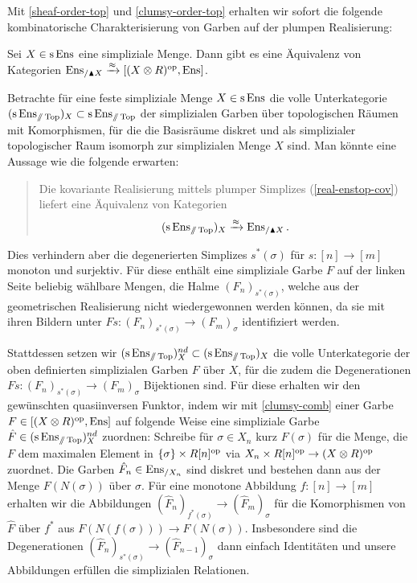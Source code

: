 Mit \ref{sheaf-order-top} und \ref{clumsy-order-top} erhalten wir
sofort die folgende kombinatorische Charakterisierung von Garben auf
der plumpen Realisierung:
\begin{prop} \label{clumsy-comb}
  Sei $X \in \operatorname{s}\operatorname{Ens}$ eine simpliziale Menge. Dann gibt es eine
  Äquivalenz von Kategorien $\operatorname{Ens}_{/\blacktriangle X} \xrightarrow{\approx} [(X
    \otimes R)^\mathrm{op}, \operatorname{Ens}]$.
\end{prop}
\begin{bem}
  Betrachte für eine feste simpliziale Menge $X \in \operatorname{s}\operatorname{Ens}$ die volle
  Unterkategorie $(\operatorname{s}\operatorname{Ens}_{\mathbin{/\mkern-6mu/} \operatorname{Top}})_X \subset \operatorname{s}\operatorname{Ens}_{\mathbin{/\mkern-6mu/} \operatorname{Top}}$ der
  simplizialen Garben über topologischen Räumen mit Komorphismen, für
  die die Basisräume diskret und als simplizialer topologischer Raum
  isomorph zur simplizialen Menge $X$ sind. Man könnte eine Aussage
  wie die folgende erwarten:
  \begin{quote}
    Die kovariante Realisierung mittels plumper Simplizes
    (\ref{real-enstop-cov}) liefert eine Äquivalenz von Kategorien
    \[ (\operatorname{s}\operatorname{Ens}_{\mathbin{/\mkern-6mu/} \operatorname{Top}})_X \xrightarrow{\approx} \operatorname{Ens}_{/\blacktriangle X}. \]
  \end{quote}
  Dies verhindern aber die degenerierten Simplizes $s^*(\sigma)$ für
  $s: [n] \to [m]$ monoton und surjektiv. Für diese enthält eine
  simpliziale Garbe $F$ auf der linken Seite beliebig wählbare Mengen,
  die Halme $(F_n)_{s^*(\sigma)}$, welche aus der geometrischen
  Realisierung nicht wiedergewonnen werden können, da sie mit ihren
  Bildern unter $Fs: (F_n)_{s^*(\sigma)} \to (F_m)_\sigma$
  identifiziert werden.

  Stattdessen setzen wir $(\operatorname{s}\operatorname{Ens}_{\mathbin{/\mkern-6mu/} \operatorname{Top}})_X^{nd} \subset
  (\operatorname{s}\operatorname{Ens}_{\mathbin{/\mkern-6mu/} \operatorname{Top}})_X$ die volle Unterkategorie der oben definierten
  simplizialen Garben $F$ über $X$, für die zudem die Degenerationen
  $Fs: (F_n)_{s^*(\sigma)} \to (F_m)_\sigma$ Bijektionen sind. Für
  diese erhalten wir den gewünschten quasiinversen Funktor, indem wir
  mit \ref{clumsy-comb} einer Garbe $F \in [(X \otimes R)^\mathrm{op}, \operatorname{Ens}]$
  auf folgende Weise eine simpliziale Garbe $\hat{F} \in
  (\operatorname{s}\operatorname{Ens}_{\mathbin{/\mkern-6mu/} \operatorname{Top}})_X^{nd}$ zuordnen: Schreibe für $\sigma \in X_n$ kurz
  $F(\sigma)$ für die Menge, die $F$ dem maximalen Element in
  $\{\sigma\} \times R[n]^\mathrm{op}$ via $X_n \times R[n]^\mathrm{op} \to (X \otimes
  R)^\mathrm{op}$ zuordnet. Die Garben $\hat{F}_n \in \operatorname{Ens}_{/X_n}$ sind diskret
  und bestehen dann aus der Menge $F(N(\sigma))$ über $\sigma$. Für
  eine monotone Abbildung $f: [n] \to [m]$ erhalten wir die
  Abbildungen $(\hat{F}_n)_{f^*(\sigma)} \to (\hat{F}_{m})_\sigma$ für
  die Komorphismen von $\hat{F}$ über $f^*$ aus $F(N(f(\sigma))) \to
  F(N(\sigma))$. Insbesondere sind die Degenerationen
  $(\hat{F}_n)_{s^*(\sigma)} \to (\hat{F}_{n-1})_\sigma$ dann einfach
  Identitäten und unsere Abbildungen erfüllen die simplizialen
  Relationen.
\end{bem}

